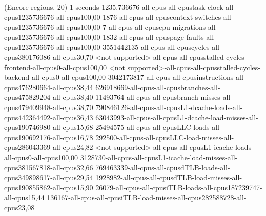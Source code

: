 (Encore regions, 20)
1 seconds
1235,736676-all-cpus-all-cpustask-clock-all-cpus1235736676-all-cpus100,00
1876-all-cpus-all-cpuscontext-switches-all-cpus1235736676-all-cpus100,00
7-all-cpus-all-cpuscpu-migrations-all-cpus1235736676-all-cpus100,00
1832-all-cpus-all-cpuspage-faults-all-cpus1235736676-all-cpus100,00
3551442135-all-cpus-all-cpuscycles-all-cpus380176086-all-cpus30,70
<not supported>-all-cpus-all-cpusstalled-cycles-frontend-all-cpus0-all-cpus100,00
<not supported>-all-cpus-all-cpusstalled-cycles-backend-all-cpus0-all-cpus100,00
3042173817-all-cpus-all-cpusinstructions-all-cpus476280664-all-cpus38,44
626918669-all-cpus-all-cpusbranches-all-cpus475829204-all-cpus38,40
11493764-all-cpus-all-cpusbranch-misses-all-cpus479409948-all-cpus38,70
790846126-all-cpus-all-cpusL1-dcache-loads-all-cpus442364492-all-cpus36,43
63043993-all-cpus-all-cpusL1-dcache-load-misses-all-cpus190746980-all-cpus15,68
25494575-all-cpus-all-cpusLLC-loads-all-cpus190692176-all-cpus16,78
292500-all-cpus-all-cpusLLC-load-misses-all-cpus286043369-all-cpus24,82
<not supported>-all-cpus-all-cpusL1-icache-loads-all-cpus0-all-cpus100,00
3128730-all-cpus-all-cpusL1-icache-load-misses-all-cpus381567818-all-cpus32,66
769463339-all-cpus-all-cpusdTLB-loads-all-cpus349898617-all-cpus29,54
1928982-all-cpus-all-cpusdTLB-load-misses-all-cpus190855862-all-cpus15,90
26079-all-cpus-all-cpusiTLB-loads-all-cpus187239747-all-cpus15,44
136167-all-cpus-all-cpusiTLB-load-misses-all-cpus282588728-all-cpus23,08
